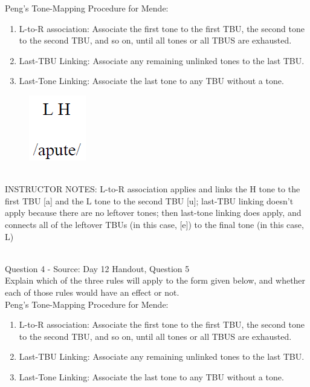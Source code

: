 \documentclass[12pt]{article}
\begin{document}
Peng’s Tone-Mapping Procedure for Mende: \begin{enumerate} \item L-to-R association: Associate the first tone to the first TBU, the second tone to the second TBU, and so on, until all tones or all TBUS are exhausted. \item Last-TBU Linking: Associate any remaining unlinked tones to the last TBU. \item Last-Tone Linking: Associate the last tone to any TBU without a tone. \end{enumerate}

\begin{figure}[H]
\includegraphics{../images/mendetone_c.png}
\end{figure}

~\\
INSTRUCTOR NOTES: L-to-R association applies and links the H tone to the first TBU [a] and the L tone to the second TBU [u]; last-TBU linking doesn't apply because there are no leftover tones; then last-tone linking does apply, and connects all of the leftover TBUs (in this case, [e]) to the final tone (in this case, L)


~\\

{\large Question 4} - Source: Day 12 Handout, Question 5\\

Explain which of the three rules will apply to the form given below, and whether each of those rules would have an effect or not.\\

Peng’s Tone-Mapping Procedure for Mende: \begin{enumerate} \item L-to-R association: Associate the first tone to the first TBU, the second tone to the second TBU, and so on, until all tones or all TBUS are exhausted. \item Last-TBU Linking: Associate any remaining unlinked tones to the last TBU. \item Last-Tone Linking: Associate the last tone to any TBU without a tone. \end{enumerate}
\end{document}
